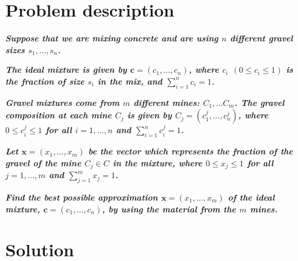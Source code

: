 \documentclass[11pt,a4paper]{article}
\newcommand{\algebraVector}[1]{\boldsymbol{#1}}
\begin{document}
\setlength{\parskip}{1em}

\section{Problem description}

\emph{\textbf{Suppose that we are mixing concrete and are using $n$ different gravel sizes
$s_1, \dots, s_n$.}}

\emph{\textbf{The ideal mixture is given by $\algebraVector{c} = (c_1, \dots, c_n)$, where
$c_i$ $(0 \leq c_i \leq 1)$ is the fraction of size $s_i$ in the mix, and $\sum_{i=1}^n c_i = 1$.}}

\emph{\textbf{Gravel mixtures come from $m$ different mines: $C_1, \dots C_m$. The gravel
composition at each mine $C_j$ is given by $C_j = (c_1^j, \dots, c_n^j)$, where $0 \leq c_i^j \leq 1$
for all $i = 1, \dots, n$ and $\sum_{i=1}^n c_i^j = 1$.}}

\emph{\textbf{Let $\algebraVector{x} = (x_1, \dots, x_m)$ be the vector which represents the
fraction of the gravel of the mine $C_j \in C$ in the mixture, where $0 \leq x_j \leq 1$ for all
$j = 1, \dots, m$ and $\sum_{j=1}^m x_j = 1$.}}

\emph{\textbf{Find the best possible approximation $\algebraVector{x} = (x_1, \dots, x_m)$
of the ideal mixture, $\algebraVector{c} = (c_1, \dots, c_n)$, by using the material from
the $m$ mines.}}

\section{Solution}
\end{document}
